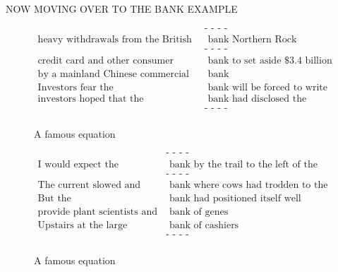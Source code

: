 \documentclass[a4paper,12pt,twoside,openright]{report}
\begin{document}
NOW MOVING OVER TO THE BANK EXAMPLE


\begin{figure}[H]
\begin{align}
\text{                                                 } & \text{- - - -} \nonumber \\
\text{heavy withdrawals from the British} & \text{ bank Northern Rock reignited concern} \nonumber \\
\text{                                                 } & \text{- - - -} \nonumber \\
\text{credit card and other consumer loans, forcing the} & \text{ bank to set aside \$3.4 billion} \nonumber \\
\text{by a mainland Chinese commercial bank in a U.S.} & \text{ bank} \nonumber \\
\text{Investors fear the} & \text{ bank will be forced to write down} \nonumber \\
\text{investors hoped that the} & \text{ bank had disclosed the} \nonumber \\
\text{                                                 } & \text{- - - -} \nonumber \\
\end{align}
\caption{A famous equation}
\end{figure}


\begin{figure}[H]
\begin{align}
\text{                                              } & \text{- - - -} \nonumber \\
\text{I would expect the} & \text{ bank by the trail to the left of the road to have been broken down} \nonumber \\
\text{                                              } & \text{- - - -} \nonumber \\
\text{The current slowed and swirled alongside a mud} & \text{ bank where cows had trodden to the water} \nonumber \\
\text{But the} & \text{ bank had positioned itself well} \nonumber \\
\text{provide plant scientists and farmers with a} & \text{ bank of genes} \nonumber \\
\text{Upstairs at the large} & \text{ bank of cashiers} \nonumber \\
\text{                                              } & \text{- - - -} \nonumber \\
\end{align}
\caption{A famous equation}
\end{figure}
\end{document}
